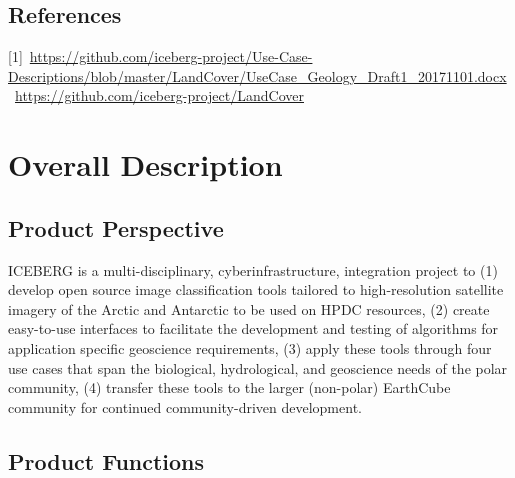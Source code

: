 \documentclass{scrreprt}
\begin{document}
\section{References}
[1]~\url{https://github.com/iceberg-project/Use-Case-Descriptions/blob/master/LandCover/UseCase_Geology_Draft1_20171101.docx}\newline
[2]~\url{https://github.com/iceberg-project/LandCover}

\chapter{Overall Description}

\section{Product Perspective}

ICEBERG is a multi-disciplinary, cyberinfrastructure, integration project to 
(1) develop open source image classification tools tailored to high-resolution 
satellite imagery of the Arctic and Antarctic to be used on HPDC resources, 
(2) create easy-to-use interfaces to facilitate the development and testing of 
algorithms for application specific geoscience requirements, 
(3) apply these tools through four use cases that span the biological, hydrological, 
and geoscience needs of the polar community, 
(4) transfer these tools to the larger (non-polar) EarthCube community for continued community-driven development.

\section{Product Functions}

\end{document}

